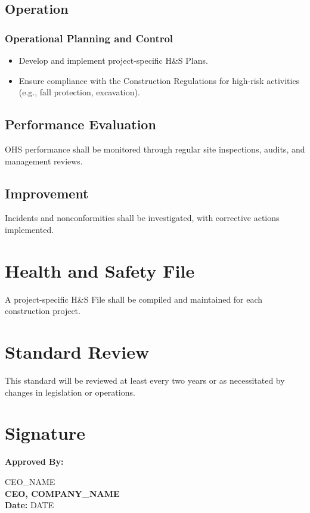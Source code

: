 \documentclass[12pt]{article}
\begin{document}
\subsection{Operation}

\subsubsection{Operational Planning and Control}
\begin{itemize}
    \item Develop and implement project-specific H\&S Plans.
    \item Ensure compliance with the Construction Regulations for high-risk activities (e.g., fall protection, excavation).
\end{itemize}

\subsection{Performance Evaluation}
OHS performance shall be monitored through regular site inspections, audits, and management reviews.

\subsection{Improvement}
Incidents and nonconformities shall be investigated, with corrective actions implemented.

\section{Health and Safety File}
A project-specific H\&S File shall be compiled and maintained for each construction project.

\section{Standard Review}
This standard will be reviewed at least every two years or as necessitated by changes in legislation or operations.

\section{Signature}
\textbf{Approved By:}

{{CEO_NAME}}\\
\textbf{CEO, {{COMPANY_NAME}}}\\
\textbf{Date:} {{DATE}}
\end{document}
